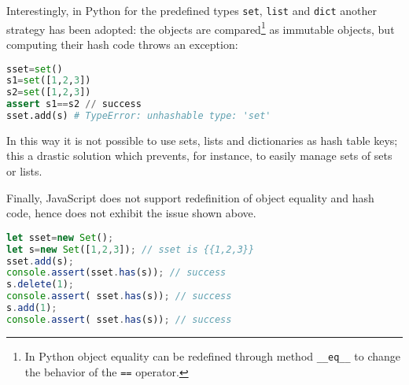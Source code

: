 Interestingly, in Python for the predefined types \lstinline{set}, \lstinline{list} and \lstinline{dict} another strategy has been adopted: the objects are compared\footnote{In Python object equality can be redefined through method \lstinline{__eq__} to change the behavior of the \lstinline{==} operator.} as
immutable objects, but computing their hash code throws an exception:
\begin{lstlisting}[language=Python]
sset=set()                                                           
s1=set([1,2,3])
s2=set([1,2,3])
assert s1==s2 // success
sset.add(s) # TypeError: unhashable type: 'set'       
\end{lstlisting}
In this way it is not possible to use sets, lists and dictionaries as hash table keys; this a drastic solution which prevents, for instance, to easily manage sets of sets or lists. 

Finally, JavaScript does not support redefinition of object equality and hash code, hence does not exhibit the issue shown above. 
\begin{lstlisting}[language=Javascript]
let sset=new Set();                                                           
let s=new Set([1,2,3]); // sset is {{1,2,3}}                                                         
sset.add(s);
console.assert(sset.has(s)); // success
s.delete(1);
console.assert( sset.has(s)); // success
s.add(1);
console.assert( sset.has(s)); // success
\end{lstlisting}
